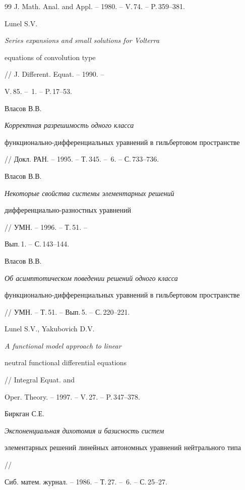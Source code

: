 \begin{thebibliography}{99}
J. Math. Anal. and Appl. -- 1980. -- V.\,74. -- P.\,359--381. 




Lunel S.V. {\em Series expansions and small solutions for Volterra 


equations of convolution type} // J. Different. Equat. -- 1990. -- 


V.\,85. -- \No\,1. -- P.\,17--53. 




Власов В.В. {\em Корректная разрешимость одного класса 


функционально-дифференциальных уравнений в гильбертовом пространстве} 


// Докл. РАН. -- 1995. -- Т.\,345. -- \No\,6. -- С.\,733--736. 




Власов В.В. {\em Некоторые свойства системы элементарных решений 


дифференциально-разностных уравнений} // УМН. -- 1996. -- Т.\,51. -- 


Вып.\,1. -- С.\,143--144. 




Власов В.В. {\em Об асимптотическом поведении решений одного класса 


функционально-дифференциальных уравнений в гильбертовом пространстве} 


// УМН. -- Т.\,51. -- Вып.\,5. -- С.\,220--221. 




Lunel S.V., Yakubovich D.V. {\em A functional model approach to linear 


neutral functional differential equations} // Integral Equat. and 


Oper. Theory. -- 1997. -- V.\,27. -- P.\,347--378. 




Биркган С.Е. {\em Экспоненциальная дихотомия и базисность систем 


элементарных решений линейных автономных уравнений нейтрального типа} // 


Сиб. матем. журнал. -- 1986. -- Т.\,27. -- \No\,6. -- С.\,25--27. 


 


 


 


\end{thebibliography} 


 


\vskip 2cm 


 






 


\label{end} 


 


